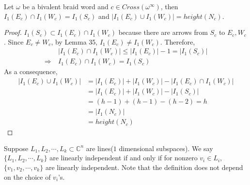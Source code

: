 \begin{lemma}
 Let $\omega$ be a bivalent braid word and $c\in Cross(\omega^\infty)$, then $I_1(E_c)\cap I_1(W_c) = I_1(S_c)$ and $|I_1(E_c)\cup I_1(W_c)| = height(N_c)$.
\end{lemma}
\begin{proof}
$I_1(S_c)\subset I_1(E_c)\cap I_1(W_c)$ because there are arrows from $S_c$ to $E_c,W_c$. Since $E_c\neq W_c$, by Lemma 35, $I_1(E_c)\neq I_1(W_c)$. Therefore, 
\begin{align*}
&~|I_1(E_c)\cap I_1(W_c)|\leq |I_1(E_c)|-1 = |I_1(S_c)| \\
\Rightarrow &~I_1(E_c)\cap I_1(W_c) = I_1(S_c)
\end{align*}
As a consequence, 
\begin{align*}
|I_1(E_c)\cup I_1(W_c)|&= |I_1(E_c)|+|I_1(W_c)|-|I_1(E_c)\cap I_1(W_c)|\\
&= |I_1(E_c)|+|I_1(W_c)|-|I_1(S_c)|\\
&= (h-1)+(h-1)-(h-2)=h\\
&=|I_1(N_c)|\\
&=height(N_c)
\end{align*}
\end{proof}

\begin{definition}
Suppose $L_1,L_2,\cdots , L_k \subset \mathbb{C}^n$ are lines($1$ dimensional subspaces). We say $\{L_1,L_2,\cdots , L_k\}$ are linearly independent if and only if for nonzero $v_i \in L_i$, $\{v_1,v_2,\cdots , v_k\}$ are linearly independent. Note that the definition does not depend on the choice of $v_i$'s.
\end{definition}

